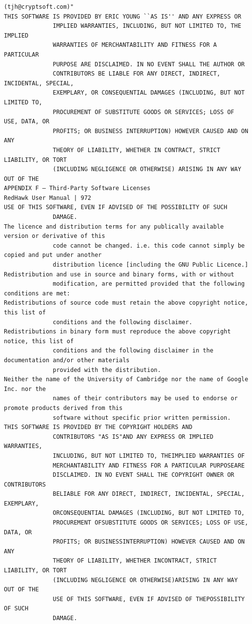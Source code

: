 \begin{lstlisting}[basicstyle=\ttfamily\scriptsize,breaklines=true]
              (tjh@cryptsoft.com)"
THIS SOFTWARE IS PROVIDED BY ERIC YOUNG ``AS IS'' AND ANY EXPRESS OR
              IMPLIED WARRANTIES, INCLUDING, BUT NOT LIMITED TO, THE IMPLIED
              WARRANTIES OF MERCHANTABILITY AND FITNESS FOR A PARTICULAR
              PURPOSE ARE DISCLAIMED. IN NO EVENT SHALL THE AUTHOR OR
              CONTRIBUTORS BE LIABLE FOR ANY DIRECT, INDIRECT, INCIDENTAL, SPECIAL,
              EXEMPLARY, OR CONSEQUENTIAL DAMAGES (INCLUDING, BUT NOT LIMITED TO,
              PROCUREMENT OF SUBSTITUTE GOODS OR SERVICES; LOSS OF USE, DATA, OR
              PROFITS; OR BUSINESS INTERRUPTION) HOWEVER CAUSED AND ON ANY
              THEORY OF LIABILITY, WHETHER IN CONTRACT, STRICT LIABILITY, OR TORT
              (INCLUDING NEGLIGENCE OR OTHERWISE) ARISING IN ANY WAY OUT OF THE
APPENDIX F — Third-Party Software Licenses                                    RedHawk User Manual | 972
USE OF THIS SOFTWARE, EVEN IF ADVISED OF THE POSSIBILITY OF SUCH
              DAMAGE.
The licence and distribution terms for any publically available version or derivative of this
              code cannot be changed. i.e. this code cannot simply be copied and put under another
              distribution licence [including the GNU Public Licence.]
Redistribution and use in source and binary forms, with or without
              modification, are permitted provided that the following conditions are met:
Redistributions of source code must retain the above copyright notice, this list of
              conditions and the following disclaimer.
Redistributions in binary form must reproduce the above copyright notice, this list of
              conditions and the following disclaimer in the documentation and/or other materials
              provided with the distribution.
Neither the name of the University of Cambridge nor the name of Google Inc. nor the
              names of their contributors may be used to endorse or promote products derived from this
              software without specific prior written permission.
THIS SOFTWARE IS PROVIDED BY THE COPYRIGHT HOLDERS AND
              CONTRIBUTORS "AS IS"AND ANY EXPRESS OR IMPLIED WARRANTIES,
              INCLUDING, BUT NOT LIMITED TO, THEIMPLIED WARRANTIES OF
              MERCHANTABILITY AND FITNESS FOR A PARTICULAR PURPOSEARE
              DISCLAIMED. IN NO EVENT SHALL THE COPYRIGHT OWNER OR CONTRIBUTORS
              BELIABLE FOR ANY DIRECT, INDIRECT, INCIDENTAL, SPECIAL, EXEMPLARY,
              ORCONSEQUENTIAL DAMAGES (INCLUDING, BUT NOT LIMITED TO,
              PROCUREMENT OFSUBSTITUTE GOODS OR SERVICES; LOSS OF USE, DATA, OR
              PROFITS; OR BUSINESSINTERRUPTION) HOWEVER CAUSED AND ON ANY
              THEORY OF LIABILITY, WHETHER INCONTRACT, STRICT LIABILITY, OR TORT
              (INCLUDING NEGLIGENCE OR OTHERWISE)ARISING IN ANY WAY OUT OF THE
              USE OF THIS SOFTWARE, EVEN IF ADVISED OF THEPOSSIBILITY OF SUCH
              DAMAGE.
\end{lstlisting}

